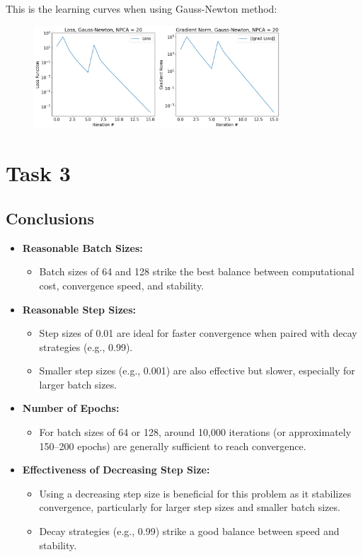 \documentclass[12pt]{article}
\begin{document}
This is the learning curves when using Gauss-Newton method:
\begin{figure}[ht]
    \centering
    \includegraphics[width=0.82\textwidth]{./imgs/gauss_newton.png}
\end{figure}


\section*{Task 3}


\subsection*{Conclusions}
\begin{itemize}
    \item \textbf{Reasonable Batch Sizes:}
    \begin{itemize}
        \item Batch sizes of 64 and 128 strike the best balance between computational cost, convergence speed, and stability.
    \end{itemize}
    \item \textbf{Reasonable Step Sizes:}
    \begin{itemize}
        \item Step sizes of 0.01 are ideal for faster convergence when paired with decay strategies (e.g., 0.99).
        \item Smaller step sizes (e.g., 0.001) are also effective but slower, especially for larger batch sizes.
    \end{itemize}
    \item \textbf{Number of Epochs:}
    \begin{itemize}
        \item For batch sizes of 64 or 128, around 10,000 iterations (or approximately 150–200 epochs) are generally sufficient to reach convergence.
    \end{itemize}
    \item \textbf{Effectiveness of Decreasing Step Size:}
    \begin{itemize}
        \item Using a decreasing step size is beneficial for this problem as it stabilizes convergence, particularly for larger step sizes and smaller batch sizes.
        \item Decay strategies (e.g., 0.99) strike a good balance between speed and stability.
    \end{itemize}
\end{itemize}
\end{document}
